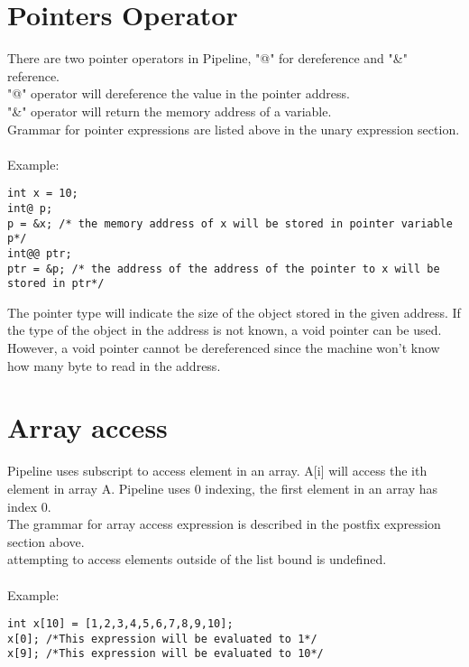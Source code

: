 \documentclass[./LRM_main.tex]{subfiles}
\begin{document}
\section{Pointers Operator}
There are two pointer operators in Pipeline, "@" for dereference and "\&" reference.\\
"@" operator will dereference the value in the pointer address.\\
"\&" operator will return the memory address of a variable.\\
Grammar for pointer expressions are listed above in the unary expression section.\\
\vspace{1 mm}\\
Example:
\begin{lstlisting}
int x = 10;
int@ p;
p = &x; /* the memory address of x will be stored in pointer variable p*/
int@@ ptr;
ptr = &p; /* the address of the address of the pointer to x will be stored in ptr*/
\end{lstlisting}
The pointer type will indicate the size of the object stored in the given address. If the type of the object in the address is not known, a void pointer can be used. However, a void pointer cannot be dereferenced since the machine won't know how many byte to read in the address. 
\section{Array access}
Pipeline uses subscript to access element in an array. A[i] will access the ith element in array A. Pipeline uses 0 indexing, the first element in an array has index 0.\\
The grammar for array access expression is described in the postfix expression section above.\\
attempting to access elements outside of the list bound is undefined.\\
\pagebreak\\
Example:
\begin{lstlisting}
int x[10] = [1,2,3,4,5,6,7,8,9,10];
x[0]; /*This expression will be evaluated to 1*/
x[9]; /*This expression will be evaluated to 10*/
\end{lstlisting}
\end{document}
